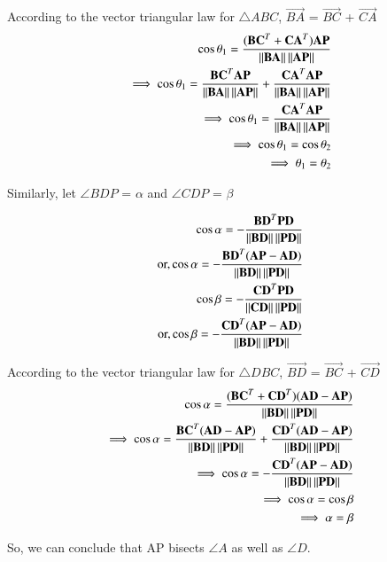 \documentclass[journal,12pt,twocolumn]{IEEEtran}
\renewcommand\thesection{\arabic{section}}
\begin{document}
According to the vector triangular law for $\triangle ABC$, $\vec{BA}$ = $\vec{BC}$ + $\vec{CA}$
\begin{align}
\cos\theta_1 = \frac{(\mathbf{BC}^T + \mathbf{CA}^T)\mathbf{AP}}{\left\lVert\mathbf{BA}\right\rVert\left\lVert\mathbf{AP}\right\rVert}\\
\implies \cos\theta_1 = \frac{\mathbf{BC}^T \mathbf{AP}}{\left\lVert\mathbf{BA}\right\rVert\left\lVert\mathbf{AP}\right\rVert} + \frac{\mathbf{CA}^T \mathbf{AP}}{\left\lVert\mathbf{BA}\right\rVert\left\lVert\mathbf{AP}\right\rVert}\\
\implies \cos\theta_1 = \frac{\mathbf{CA}^T \mathbf{AP}}{\left\lVert\mathbf{BA}\right\rVert\left\lVert\mathbf{AP}\right\rVert}\\
\implies \cos\theta_1 = \cos\theta_2\\
\implies \theta_1 = \theta_2
\end{align}

Similarly, let $\angle BDP$ = $\alpha$ and $\angle CDP$ = $\beta$

\begin{align}
\cos\alpha = -\frac{\mathbf{BD}^T \mathbf{PD}}{\left\lVert\mathbf{BD}\right\rVert\left\lVert\mathbf{PD}\right\rVert}\\
\text{or,} \cos\alpha = -\frac{\mathbf{BD}^T (\mathbf{AP}-\mathbf{AD})}{\left\lVert\mathbf{BD}\right\rVert\left\lVert\mathbf{PD}\right\rVert}\\
\cos\beta = - \frac{\mathbf{CD}^T \mathbf{PD}}{\left\lVert\mathbf{CD}\right\rVert\left\lVert\mathbf{PD}\right\rVert}\\
\text{or,}\cos\beta = - \frac{\mathbf{CD}^T (\mathbf{AP}-\mathbf{AD})}{\left\lVert\mathbf{BD}\right\rVert\left\lVert\mathbf{PD}\right\rVert}
\end{align}

According to the vector triangular law for $\triangle DBC$, $\vec{BD}$ = $\vec{BC}$ + $\vec{CD}$
\begin{align}
\cos\alpha = \frac{(\mathbf{BC}^T + \mathbf{CD}^T)(\mathbf{AD}-\mathbf{AP})}{\left\lVert\mathbf{BD}\right\rVert\left\lVert\mathbf{PD}\right\rVert}\\
\implies \cos\alpha = \frac{\mathbf{BC}^T (\mathbf{AD}-\mathbf{AP})}{\left\lVert\mathbf{BD}\right\rVert\left\lVert\mathbf{PD}\right\rVert} + \frac{\mathbf{CD}^T (\mathbf{AD}-\mathbf{AP})}{\left\lVert\mathbf{BD}\right\rVert\left\lVert\mathbf{PD}\right\rVert}\\
\implies \cos\alpha = - \frac{\mathbf{CD}^T (\mathbf{AP}-\mathbf{AD})}{\left\lVert\mathbf{BD}\right\rVert\left\lVert\mathbf{PD}\right\rVert}\\
\implies \cos\alpha = \cos\beta\\
\implies \alpha = \beta
\end{align}

So, we can conclude that AP bisects $\angle A$ as well as $\angle D$.
\renewcommand{\theequation}{\theenumi}
%
\end{document}
